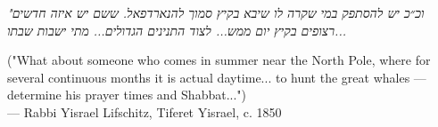 
\begin{flushright}
\begin{hebrew}
\emph{"וכ״כ יש להסתפק במי שקרה לו שיבא בקיץ סמוך להנארדפאל. ששם יש איזה חדשים רצופים בקיץ יום ממש... לצוד התנינים הגדולים... מתי ישבות שבתו...}\\
\end{hebrew}
("What about someone who comes in summer near the North Pole, where for several continuous months it is actual daytime... to hunt the great whales — determine his prayer times and Shabbat...")\\
— Rabbi Yisrael Lifschitz, Tiferet Yisrael, c. 1850
\end{flushright}